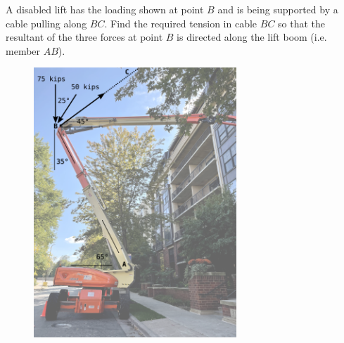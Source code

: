 
A disabled lift has the loading shown at point $B$ and is being supported by a cable pulling along $BC$.  Find the required tension in cable $BC$ so that the resultant of the three forces at point $B$ is directed along the lift boom (i.e. member $AB$).

\begin{figure}[ht!]
  \centering
  \includegraphics[width=3.0in]{fig.png}
\end{figure}

